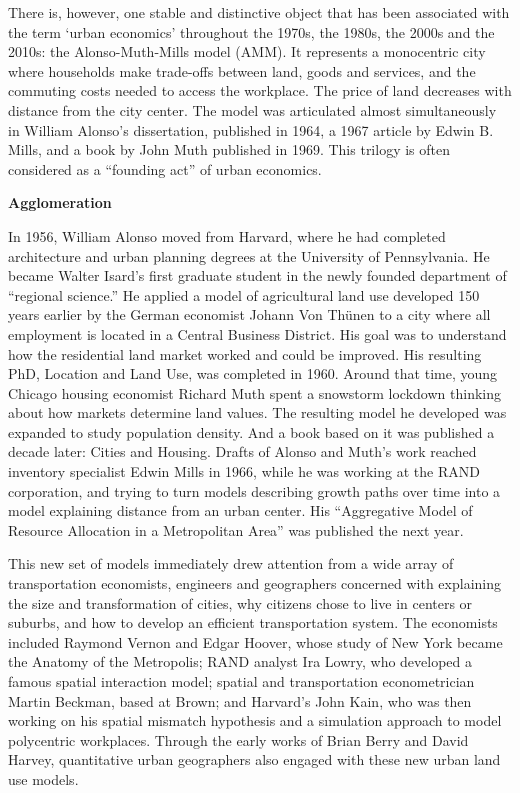 \documentclass[
]{book}
\begin{document}
There is, however, one stable and distinctive object that has been associated with the term `urban economics' throughout the 1970s, the 1980s, the 2000s and the 2010s: the Alonso-Muth-Mills model (AMM). It represents a monocentric city where households make trade-offs between land, goods and services, and the commuting costs needed to access the workplace. The price of land decreases with distance from the city center. The model was articulated almost simultaneously in William Alonso's dissertation, published in 1964, a 1967 article by Edwin B. Mills, and a book by John Muth published in 1969. This trilogy is often considered as a ``founding act'' of urban economics.

\textbf{Agglomeration}

In 1956, William Alonso moved from Harvard, where he had completed architecture and urban planning degrees at the University of Pennsylvania. He became Walter Isard's first graduate student in the newly founded department of ``regional science.'' He applied a model of agricultural land use developed 150 years earlier by the German economist Johann Von Thünen to a city where all employment is located in a Central Business District. His goal was to understand how the residential land market worked and could be improved. His resulting PhD, Location and Land Use, was completed in 1960. Around that time, young Chicago housing economist Richard Muth spent a snowstorm lockdown thinking about how markets determine land values. The resulting model he developed was expanded to study population density. And a book based on it was published a decade later: Cities and Housing. Drafts of Alonso and Muth's work reached inventory specialist Edwin Mills in 1966, while he was working at the RAND corporation, and trying to turn models describing growth paths over time into a model explaining distance from an urban center. His ``Aggregative Model of Resource Allocation in a Metropolitan Area'' was published the next year.

This new set of models immediately drew attention from a wide array of transportation economists, engineers and geographers concerned with explaining the size and transformation of cities, why citizens chose to live in centers or suburbs, and how to develop an efficient transportation system. The economists included Raymond Vernon and Edgar Hoover, whose study of New York became the Anatomy of the Metropolis; RAND analyst Ira Lowry, who developed a famous spatial interaction model; spatial and transportation econometrician Martin Beckman, based at Brown; and Harvard's John Kain, who was then working on his spatial mismatch hypothesis and a simulation approach to model polycentric workplaces. Through the early works of Brian Berry and David Harvey, quantitative urban geographers also engaged with these new urban land use models.
\end{document}

